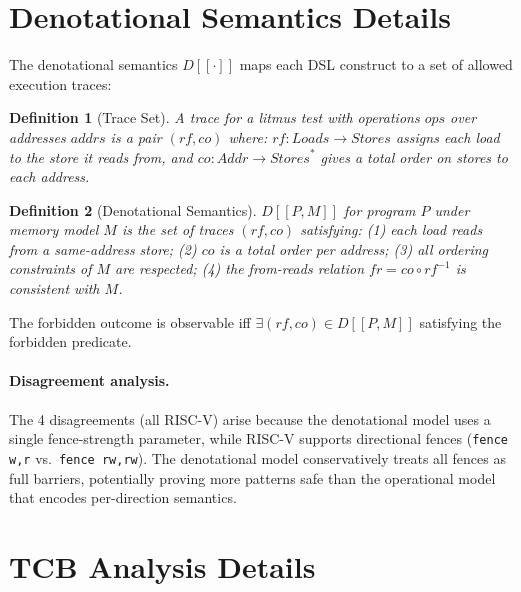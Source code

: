 \documentclass[11pt]{article}
\newtheorem{definition}{Definition}
\begin{document}
\section{Denotational Semantics Details}
\label{app:denotational-details}

The denotational semantics $D[\![\cdot]\!]$ maps each DSL construct
to a set of allowed execution traces:

\begin{definition}[Trace Set]
A \emph{trace} for a litmus test with operations $\mathit{ops}$
over addresses $\mathit{addrs}$ is a pair $(\mathit{rf}, \mathit{co})$ where:
$\mathit{rf}: \mathit{Loads} \to \mathit{Stores}$ assigns each load
to the store it reads from, and
$\mathit{co}: \mathit{Addr} \to \mathit{Stores}^*$ gives a total
order on stores to each address.
\end{definition}

\begin{definition}[Denotational Semantics]
$D[\![P, M]\!]$ for program $P$ under memory model $M$ is the set
of traces $(\mathit{rf}, \mathit{co})$ satisfying:
(1) each load reads from a same-address store;
(2) $\mathit{co}$ is a total order per address;
(3) all ordering constraints of $M$ are respected;
(4) the from-reads relation $\mathit{fr} = \mathit{co} \circ \mathit{rf}^{-1}$
is consistent with $M$.
\end{definition}

The forbidden outcome is observable iff $\exists (\mathit{rf}, \mathit{co})
\in D[\![P, M]\!]$ satisfying the forbidden predicate.

\paragraph{Disagreement analysis.}
The 4 disagreements (all RISC-V) arise because the denotational model
uses a single fence-strength parameter, while RISC-V supports
directional fences (\texttt{fence w,r} vs.\ \texttt{fence rw,rw}).
The denotational model conservatively treats all fences as full
barriers, potentially proving more patterns safe than the operational
model that encodes per-direction semantics.

\section{TCB Analysis Details}
\label{app:tcb-details}
\end{document}
